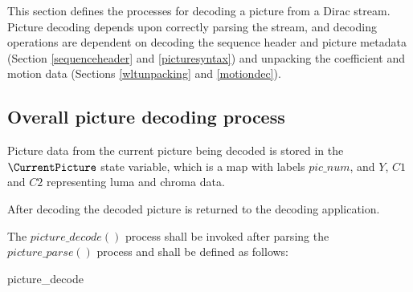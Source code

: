 
\label{picturedec}

This section defines the processes for decoding a picture from a Dirac stream. 
Picture decoding depends upon correctly parsing the stream, and decoding operations
 are dependent on decoding the sequence header and picture metadata 
(Section \ref{sequenceheader} and \ref{picturesyntax}) and unpacking the coefficient 
and motion data (Sections \ref{wltunpacking} and \ref{motiondec}).

\subsection{Overall picture decoding process}
\label{overallpicturedec}

Picture data from the current picture being decoded is stored in the $\CurrentPicture$ state
variable, which is a map with labels $pic\_num$, and $Y$, $C1$ and $C2$ representing
luma and chroma data.

After decoding the decoded picture is returned to the decoding application.

The $picture\_decode()$ process shall be invoked after parsing the $picture\_parse()$ process and shall be defined as follows:

\begin{pseudo}{picture\_decode}{}
\bsCODE{\CurrentPicture=\{\}}
\bsEND
\bsIF{\ZeroResidual==\false}
\bsEND
{}
    \bsEND
\bsEND
{}
\bsEND
{}
\bsRET{\CurrentPicture}
\end{pseudo}

